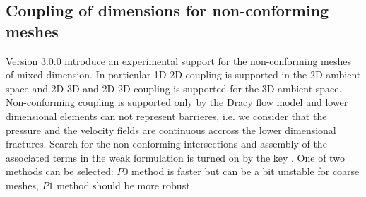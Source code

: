 \subsection{Coupling of dimensions for non-conforming meshes}
Version 3.0.0 introduce an experimental support for the non-conforming meshes of mixed dimension. 
In particular 1D-2D coupling is supported in the 2D ambient space and 2D-3D and 2D-2D coupling is 
supported for the 3D ambient space. Non-conforming coupling is supported only by the Dracy flow model
and lower dimensional elements can not represent barrieres, i.e. we consider that the pressure 
and the velocity fields are continuous accross the lower dimensional fractures. Search for the non-conforming intersections 
and assembly of the associated terms in the weak formulation is turned on by the key .
One of two methods can be selected: $P0$ method is faster but can be a bit unstable for coarse meshes, $P1$ method should be more robust.

    

